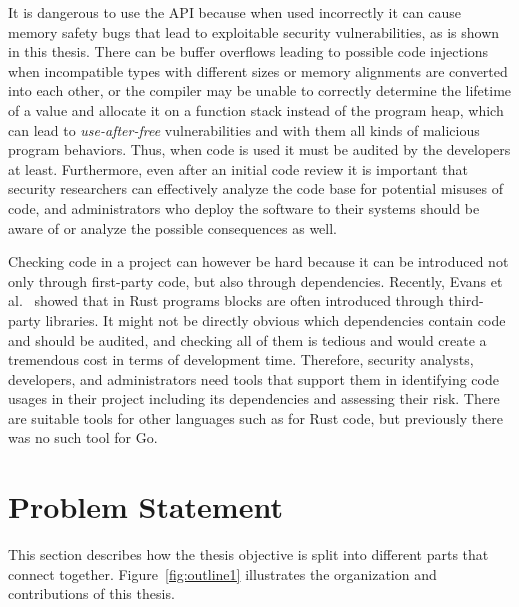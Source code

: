 It is dangerous to use the \unsafe{} \acrshort{API} because when used incorrectly it can cause memory safety bugs that
lead to exploitable security vulnerabilities, as is shown in this thesis.
There can be buffer overflows leading to possible code injections when incompatible types with different sizes or
memory alignments are converted into each other, or the compiler may be unable to correctly determine the lifetime of
a value and allocate it on a function stack instead of the program heap, which can lead to \textit{use-after-free}
vulnerabilities and with them all kinds of malicious program behaviors.
Thus, when \unsafe{} code is used it must be audited by the developers at least.
Furthermore, even after an initial code review it is important that security researchers can effectively analyze the
code base for potential misuses of \unsafe{} code, and administrators who deploy the software to their systems should
be aware of or analyze the possible consequences as well.

Checking \unsafe{} code in a project can however be hard because it can be introduced not only through first-party
code, but also through dependencies.
Recently, Evans et al.~\cite{evans2020} showed that in Rust programs \unsafe{} blocks are often introduced through
third-party libraries.
It might not be directly obvious which dependencies contain \unsafe{} code and should be audited, and checking all of
them is tedious and would create a tremendous cost in terms of development time.
Therefore, security analysts, developers, and administrators need tools that support them in identifying \unsafe{}
code usages in their project including its dependencies and assessing their risk.
There are suitable tools for other languages such as \toolCargoGeiger{} for Rust code, but previously there was no such
tool for Go.



\section{Problem Statement}\label{sec:introduction:problem-statement}

This section describes how the thesis objective is split into different parts that connect together.
Figure~\ref{fig:outline1} illustrates the organization and contributions of this thesis.




